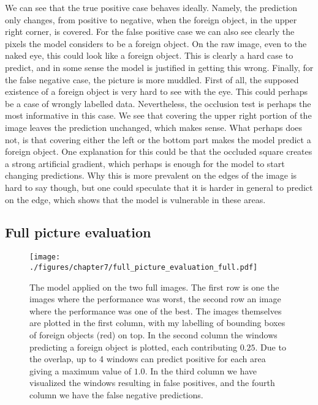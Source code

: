 We can see that the true positive case behaves ideally. Namely, the prediction only changes, from positive to negative, when the foreign object, in the upper right corner, is covered. For the false positive case we can also see clearly the pixels the model considers to be a foreign object. 
On the raw image, even to the naked eye, this could look like a foreign object. This is clearly a hard case to predict, and in some sense the model is justified in getting this wrong. 
Finally, for the false negative case, the picture is more muddled. First of all, the supposed existence of a foreign object is very hard to see with the eye. This could perhaps be a case of wrongly labelled data. Nevertheless, the occlusion test is perhaps the most informative in this case. We see that covering the upper right portion of the image leaves the prediction unchanged, which makes sense. What perhaps does not, is that covering either the left or the bottom part makes the model predict a foreign object. One explanation for this could be that the occluded square creates a strong artificial gradient, which perhaps is enough for the model to start changing predictions. Why this is more prevalent on the edges of the image is hard to say though, but one could speculate that it is harder in general to predict on the edge, which shows that the model is vulnerable in these areas.

\subsection{Full picture evaluation}
\begin{figure}[t]
	\begin{whole}
		\texttt{[image: ./figures/chapter7/full\_picture\_evaluation\_full.pdf]}
		\caption{The model applied on the two full images. The first row is one the images where the performance was worst, the second row an image where the performance was one of the best. The images themselves are plotted in the first column, with my labelling of bounding boxes of foreign objects (red) on top. In the second column the windows predicting a foreign object is plotted, each contributing $0.25$. Due to the overlap, up to 4 windows can predict positive for each area giving a maximum value of $1.0$. In the third column we have visualized the windows resulting in false positives, and the fourth column we have the false negative predictions.}
		\label{fig:full_pic}
	\end{whole}
\end{figure}


